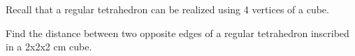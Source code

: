 Recall that a regular tetrahedron can be realized using 4 vertices of a cube. 

Find the distance between two opposite edges of a regular tetrahedron inscribed in a 2x2x2 cm cube.